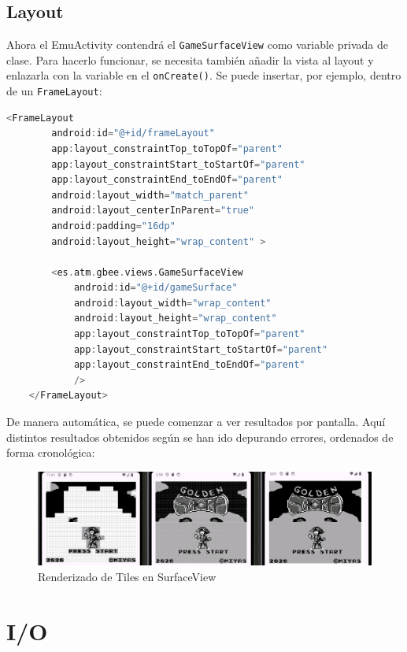 \subsection{Layout}

Ahora el EmuActivity contendrá el \texttt{GameSurfaceView} como variable privada de clase. Para hacerlo funcionar, se necesita también añadir la vista al layout y enlazarla con la variable en el \texttt{onCreate()}. Se puede insertar, por ejemplo, dentro de un \texttt{FrameLayout}:

\begin{lstlisting}[language=Kotlin, caption={GameSurfaceView en Layout.}, label={code:surfacelayout}]
    <FrameLayout
        android:id="@+id/frameLayout"
        app:layout_constraintTop_toTopOf="parent"
        app:layout_constraintStart_toStartOf="parent"
        app:layout_constraintEnd_toEndOf="parent"
        android:layout_width="match_parent"
        android:layout_centerInParent="true"
        android:padding="16dp"
        android:layout_height="wrap_content" >

        <es.atm.gbee.views.GameSurfaceView
            android:id="@+id/gameSurface"
            android:layout_width="wrap_content"
            android:layout_height="wrap_content"
            app:layout_constraintTop_toTopOf="parent"
            app:layout_constraintStart_toStartOf="parent"
            app:layout_constraintEnd_toEndOf="parent"
            />
    </FrameLayout>
\end{lstlisting}

De manera automática, se puede comenzar a ver resultados por pantalla. Aquí distintos resultados obtenidos según se han ido depurando errores, ordenados de forma cronológica:

\begin{figure}[H]
    \centering
    \includegraphics[width=1\textwidth]{include/images/render_surface_view.png}
    \caption{Renderizado de Tiles en SurfaceView}\label{figure:surface_view}
\end{figure}

\section{I/O}

